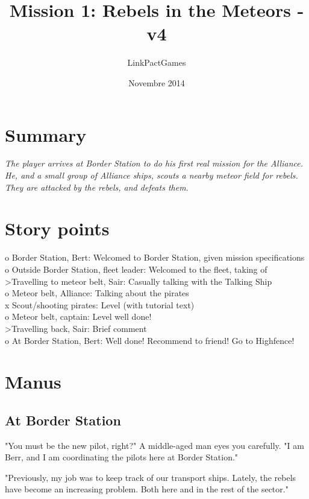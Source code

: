 \documentclass[a4paper,12pt]{article}
\begin{document}
\title{Mission 1: Rebels in the Meteors - v4}
\author{LinkPactGames}
\date{Novembre 2014}
\maketitle

\section{Summary}
\textit{The player arrives at Border Station to do his first real mission
for the Alliance. He, and a small group of Alliance ships, scouts a nearby meteor field
for rebels. They are attacked by the rebels, and defeats them.}

\section{Story points}

o Border Station, Bert: Welcomed to Border Station, given mission specifications\\
o Outside Border Station, fleet leader: Welcomed to the fleet, taking of\\
\textgreater  Travelling to meteor belt, Sair: Casually talking with the Talking Ship\\
o Meteor belt, Alliance: Talking about the pirates\\
x Scout/shooting pirates: Level (with tutorial text)\\
o Meteor belt, captain: Level well done!\\
\textgreater  Travelling back, Sair: Brief comment\\
o At Border Station, Bert: Well done! Recommend to friend! Go to Highfence!

\section{Manus}

\subsection{At Border Station}

"You must be the new pilot, right?" A middle-aged man eyes you carefully.
"I am Berr, and I am coordinating the pilots here at Border Station."

"Previously, my job was to keep track of our transport ships. Lately, the
rebels have become an increasing problem. Both here and in the rest of the sector."
\end{document}
